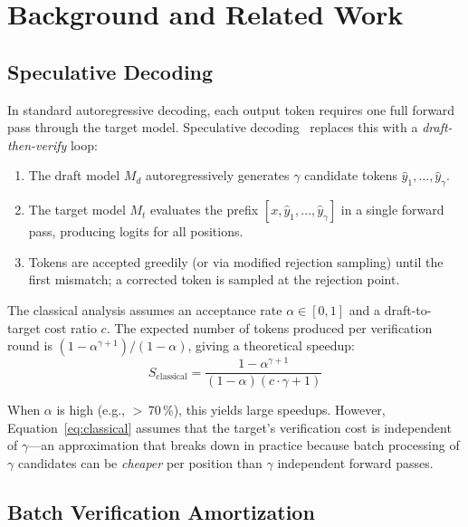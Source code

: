 \documentclass[11pt,a4paper]{article}
\begin{document}
\section{Background and Related Work}

\subsection{Speculative Decoding}

In standard autoregressive decoding, each output token requires one full forward pass through the target model. Speculative decoding~\cite{leviathan2023fast, chen2023accelerating} replaces this with a \emph{draft-then-verify} loop:

\begin{enumerate}[nosep]
  \item The draft model $M_d$ autoregressively generates $\gamma$ candidate tokens $\hat{y}_1, \ldots, \hat{y}_\gamma$.
  \item The target model $M_t$ evaluates the prefix $[x, \hat{y}_1, \ldots, \hat{y}_\gamma]$ in a single forward pass, producing logits for all positions.
  \item Tokens are accepted greedily (or via modified rejection sampling) until the first mismatch; a corrected token is sampled at the rejection point.
\end{enumerate}

The classical analysis assumes an acceptance rate $\alpha \in [0,1]$ and a draft-to-target cost ratio $c$. The expected number of tokens produced per verification round is $(1 - \alpha^{\gamma+1})/(1-\alpha)$, giving a theoretical speedup:
\begin{equation}
  S_{\text{classical}} = \frac{1 - \alpha^{\gamma+1}}{(1 - \alpha)(c \cdot \gamma + 1)}
  \label{eq:classical}
\end{equation}

When $\alpha$ is high (e.g., $>$\,70\,\%), this yields large speedups. However, Equation~\ref{eq:classical} assumes that the target's verification cost is independent of $\gamma$---an approximation that breaks down in practice because batch processing of $\gamma$ candidates can be \emph{cheaper} per position than $\gamma$ independent forward passes.

\subsection{Batch Verification Amortization}
\end{document}
